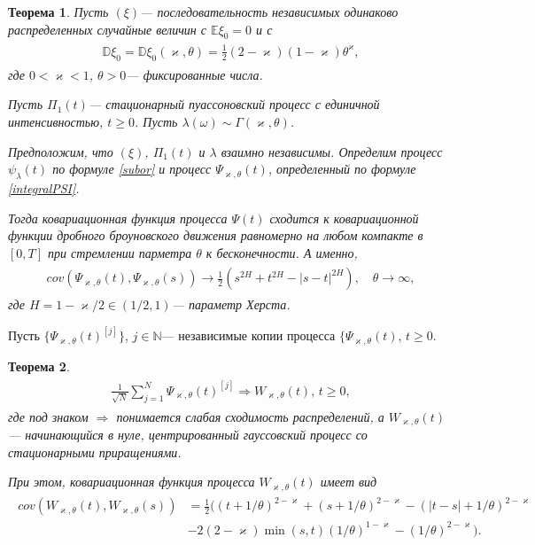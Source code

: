 \documentclass[a4paper,12pt]{article}
\numberwithin{equation}{section}
\newcommand{\N}{\mathbb N}
\newtheorem{Theorem}{Теорема}
\begin{document}
	\begin{Theorem}
		Пусть $(\xi)$--- последовательность независимых одинаково распределенных случайные величин с $\mathbb{E}\xi_0 = 0$ и с 
		\begin{align}
		\begin{split}
		\mathbb{D}\xi_0 = \mathbb{D}\xi_0(\varkappa, \theta) = \frac{1}{2}(2-\varkappa)(1-\varkappa)\theta^{\varkappa},
		\end{split}
		\end{align}
		где $0<\varkappa<1$, $\theta>0$--- фиксированные числа. 
		
		Пусть $\Pi_1(t)$--- стационарный пуассоновский процесс с единичной интенсивностью, $t \geq 0$. Пусть $\lambda(\omega) \sim \Gamma(\varkappa, \theta)$. 
		
		Предположим, что $(\xi)$, $\Pi_1(t)$ и $\lambda$ взаимно независимы. Определим процесс $\psi_{\lambda}(t)$ по формуле \eqref{subor} и процесс $\Psi_{\varkappa, \theta}(t)$, определенный по формуле \eqref{integralPSI}. 
		
		Тогда ковариационная функция процесса $\Psi(t)$ сходится к ковариационной функции дробного броуновского движения равномерно на любом компакте в $[0,T]$ при стремлении парметра $\theta$ к бесконечности. А именно, 
		\begin{align}
		\begin{split}
		cov(\Psi_{\varkappa, \theta}(t), \Psi_{\varkappa, \theta}(s)) \to \frac{1}{2}(s^{2H} + t^{2H}-|s-t|^{2H}), \quad \theta \to \infty,
		\end{split}
		\end{align} 
		где $H = 1-\varkappa/2 \in (1/2, 1)$--- параметр Херста. 
	\end{Theorem}
	Пусть $\{\Psi_{\varkappa, \theta}(t)^{[j]}\}$, $j \in \N$--- независимые копии процесса $\{\Psi_{\varkappa, \theta}(t)$, $t \geq 0$. 
	\begin{Theorem}
		\begin{align}
		\begin{split}
		\frac{1}{\sqrt{N}}\sum_{j=1}^{N}\Psi_{\varkappa, \theta}(t)^{[j]} \Rightarrow W_{\varkappa, \theta}(t), \, t\geq 0, 
		\end{split}
		\end{align}
		где под знаком $\Rightarrow$ понимается слабая сходимость распределений, а $W_{\varkappa, \theta}(t)$--- начинающийся в нуле, центрированный гауссовский процесс со стационарными приращениями.  
		
		При этом, ковариационная функция процесса $W_{\varkappa, 
			\theta}(t)$ имеет вид
		\begin{align}
		\begin{split}
		cov(W_{\varkappa, 
			\theta}(t), W_{\varkappa, 
			\theta}(s)) &= \frac{1}{2}\biggr( (t+1/\theta)^{2-\varkappa} + (s+1/\theta)^{2-\varkappa}-(|t-s| +  1/\theta)^{2-\varkappa}\\&-2(2-\varkappa)\min(s,t )(1/\theta)^{1-\varkappa}-(1/\theta)^{2-\varkappa}\biggr). 
		\end{split}
		\end{align}
	\end{Theorem} 
\end{document}
